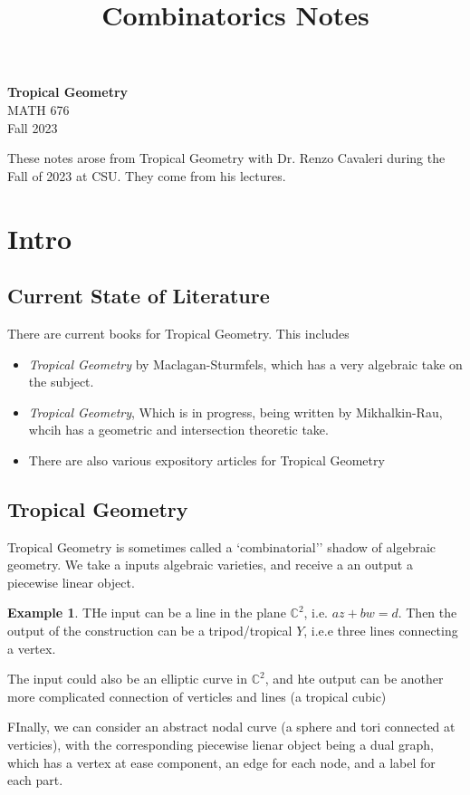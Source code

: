 \documentclass[11pt]{article}
\theoremstyle{definition}
\theoremstyle{plain}%
\theoremstyle{definition}
\newtheorem{protoexample}{Example}[section]
\newenvironment{ex}
   {\colorlet{shadecolor}{red!15}\begin{shaded}\begin{protoexample}}
   {\end{protoexample}\end{shaded}}
\def\CC{{\mathbb C}}
\begin{document}
\title{Combinatorics Notes}




\thispagestyle{empty}


\begin{center}
{\LARGE \bf Tropical Geometry}\\
{\large MATH 676}\\
Fall 2023
\end{center}

These notes arose from Tropical Geometry with Dr. Renzo Cavaleri during the Fall of 2023 at CSU. They come from his lectures.

\tableofcontents

\newpage


\section{Intro}

\subsection{Current State of Literature}

There are current books for Tropical Geometry. This includes
\begin{itemize}
    \item \emph{Tropical Geometry} by Maclagan-Sturmfels, which has a very algebraic take on the subject.
    \item \emph{Tropical Geometry}, Which is in progress, being written by Mikhalkin-Rau, whcih has a geometric and intersection theoretic take.
    \item There are also various expository articles for Tropical Geometry
\end{itemize}

\subsection{Tropical Geometry}

Tropical Geometry is sometimes called a `combinatorial'' shadow of algebraic geometry. We take a inputs algebraic varieties, and receive a an output a piecewise linear object.

\begin{ex}
    THe input can be a line in the plane $\CC^2$, i.e. $az+bw=d$. Then the output of the construction can be a tripod/tropical $Y$, i.e.e three lines connecting a vertex.


    The input could also be an elliptic curve in $\CC^2$, and hte output can be another more complicated connection of verticles and lines (a tropical cubic)


    FInally, we can consider an abstract  nodal curve (a sphere and tori connected at verticies), with the corresponding piecewise lienar object being a dual graph, which has a vertex at ease component, an edge for each node, and a label for each part.
\end{ex}
\end{document}
